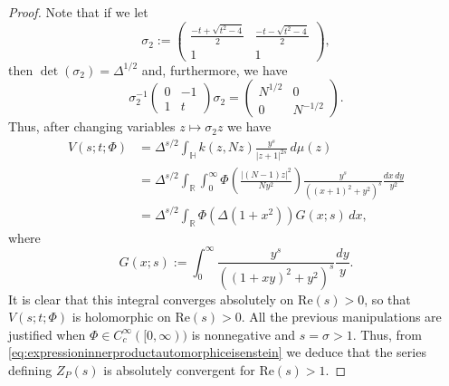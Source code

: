 \documentclass{article}
\theoremstyle{named}
\newcommand{\Hyp}{\mathbb{H}}
\newcommand{\R}{\mathbb{R}}
\begin{document}
\begin{proof}
Note that if we let 
\begin{equation*}
\sigma_2 := \begin{pmatrix}
    \frac{-t + \sqrt{t^2 - 4}}{2} & \frac{-t - \sqrt{t^2 - 4}}{2}\\
    1 & 1
\end{pmatrix},
\end{equation*}
then $\det(\sigma_2) = \Delta^{1/2}$ and, furthermore, we have 
\begin{equation*}
    \sigma_2^{-1}\begin{pmatrix}
    0 & -1\\
    1 & t
\end{pmatrix} \sigma_2 = \begin{pmatrix}
    N^{1/2} & 0\\
    0 & N^{-1/2}
\end{pmatrix}.
\end{equation*}
Thus, after changing variables $z \mapsto \sigma_2 z$ we have
\begin{equation*}
\begin{aligned}
    V(s;t; \Phi) & = \Delta^{s/2}\int_\Hyp k(z, Nz) \frac{y^s}{|z  + 1|^{2s}}\, d\mu(z)\\
    & = \Delta^{s/2}\int_\R\int_0^\infty \Phi\left(\frac{|(N - 1)z|^2}{Ny^2}\right) \frac{y^s}{((x + 1)^2 + y^2)^s} \frac{dx\, dy}{y^2}\\
    & = \Delta^{s/2}\int_\R \Phi(\Delta(1 + x^2))G(x; s) \, dx,
\end{aligned}
\end{equation*}
where 
\begin{equation*}
G(x; s) := \int_0^\infty \frac{y^s}{((1 + xy)^2 + y^2)^s} \frac{dy}{y}.
\end{equation*}
It is clear that this integral converges absolutely on $\text{Re}(s) > 0$, so that $V(s;t; \Phi)$ is holomorphic on $\text{Re}(s) > 0$. All the previous manipulations are justified when $\Phi \in C_c^\infty([0, \infty))$ is nonnegative and $s = \sigma > 1$. Thus, from \eqref{eq:expressioninnerproductautomorphiceisenstein} we deduce that the series defining $Z_P(s)$ is absolutely convergent for $\text{Re}(s) > 1$. 


\end{proof}
\end{document}
